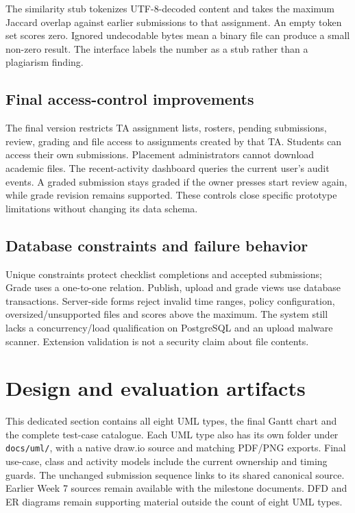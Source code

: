 \documentclass[11pt,a4paper]{article}
\begin{document}
The similarity stub tokenizes UTF-8-decoded content and takes the maximum Jaccard overlap against earlier submissions to that assignment. An empty token set scores zero. Ignored undecodable bytes mean a binary file can produce a small non-zero result. The interface labels the number as a stub rather than a plagiarism finding.

\subsection{Final access-control improvements}
The final version restricts TA assignment lists, rosters, pending submissions, review, grading and file access to assignments created by that TA. Students can access their own submissions. Placement administrators cannot download academic files. The recent-activity dashboard queries the current user's audit events. A graded submission stays graded if the owner presses start review again, while grade revision remains supported. These controls close specific prototype limitations without changing its data schema.

\subsection{Database constraints and failure behavior}
Unique constraints protect checklist completions and accepted submissions; Grade uses a one-to-one relation. Publish, upload and grade views use database transactions. Server-side forms reject invalid time ranges, policy configuration, oversized/unsupported files and scores above the maximum. The system still lacks a concurrency/load qualification on PostgreSQL and an upload malware scanner. Extension validation is not a security claim about file contents.

\section{Design and evaluation artifacts}
This dedicated section contains all eight UML types, the final Gantt chart and the complete test-case catalogue. Each UML type also has its own folder under \nolinkurl{docs/uml/}, with a native draw.io source and matching PDF/PNG exports. Final use-case, class and activity models include the current ownership and timing guards. The unchanged submission sequence links to its shared canonical source. Earlier Week 7 sources remain available with the milestone documents. DFD and ER diagrams remain supporting material outside the count of eight UML types.
\end{document}
